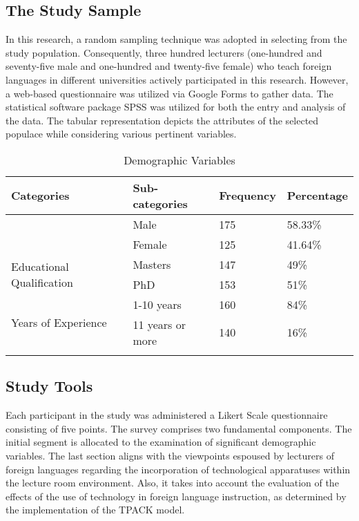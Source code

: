 \documentclass[english]{textolivre}
\begin{document}
\subsection{The Study Sample}

    In this research, a random sampling technique was adopted in selecting from the study population. Consequently, three hundred lecturers (one-hundred and seventy-five male and one-hundred and twenty-five female) who teach foreign languages in different universities actively participated in this research. However, a web-based questionnaire was utilized via Google Forms to gather data. The statistical software package SPSS was utilized for both the entry and analysis of the data. The tabular representation depicts the attributes of the selected populace while considering various pertinent variables.

\begin{table}[h!]
\centering
\begin{threeparttable}
\caption{Demographic Variables}
\label{tab1}
\begin{tabular}{llll}
\toprule
Categories & Sub-categories & Frequency & Percentage \\ \midrule
\arrayrulecolor[gray]{.7}
\multirow{2}{*}{Gender} & Male & 175 & 58.33\% \\ %
 & Female & 125 & 41.64\% \\ \midrule %
\multirow{2}{*}{Educational Qualification} & Masters & 147 & 49\% \\ %
 & PhD & 153 & 51\% \\ \midrule %
\multirow{2}{*}{Years of Experience} & 1-10 years & 160 & 84\% \\ %
 & 11 years or more & 140 & 16\% \\ 
\arrayrulecolor{black}
\bottomrule
\end{tabular}
\end{threeparttable}
\end{table}

\subsection{Study Tools}

    Each participant in the study was administered a Likert Scale questionnaire consisting of five points. The survey comprises two fundamental components. The initial segment is allocated to the examination of significant demographic variables. The last section aligns with the viewpoints espoused by lecturers of foreign languages regarding the incorporation of technological apparatuses within the lecture room environment. Also, it takes into account the evaluation of the effects of the use of technology in foreign language instruction, as determined by the implementation of the TPACK model.
\end{document}
